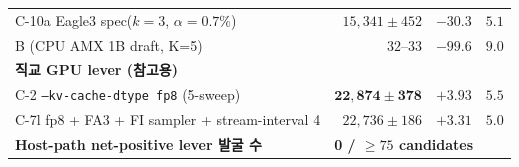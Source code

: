 \begin{table}[t]
{\begin{tabular}{@{}lrrl@{}}
C-10a Eagle3 spec($k\!=\!3$, $\alpha\!=\!0.7\%$) & $15{,}341\!\pm\!452$ & $-30.3$ & $5.1$ \\
B (CPU AMX 1B draft, K=5)                  & $32$--$33$           & $-99.6$ & $9.0$  \\
\midrule
\textbf{직교 GPU lever (참고용)} &  &  &  \\
\quad C-2 \texttt{--kv-cache-dtype fp8} (5-sweep) & $\mathbf{22{,}874\!\pm\!378}$ & $\mathbf{+3.93}$ & $5.5$ \\
\quad C-7l fp8 + FA3 + FI sampler + stream-interval 4 & $22{,}736\!\pm\!186$ & $+3.31$ & $5.0$ \\
\midrule
\textbf{Host-path net-positive lever 발굴 수} & \multicolumn{3}{l}{\textbf{0 / $\ge75$ candidates}} \\
\bottomrule
\end{tabular}}
\end{table}
